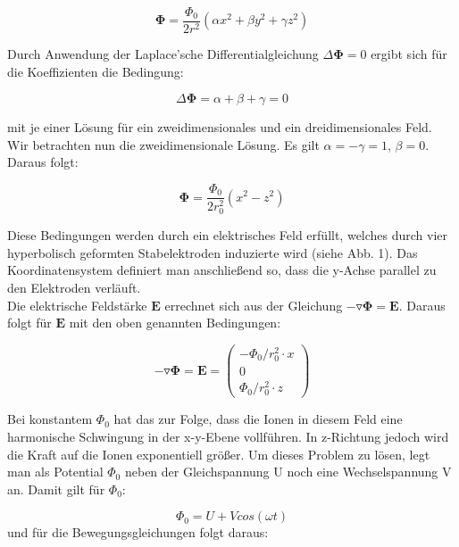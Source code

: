 \begin{equation}
\mathbf{\Phi} = \frac{\Phi_{0}}{2r^{2}}\left(\alpha x^{2}+\beta y^{2}+\gamma z^{2}\right)
\end{equation}

Durch Anwendung der Laplace'sche Differentialgleichung $\Delta \mathbf{\Phi} =0$ ergibt sich für die Koeffizienten die Bedingung:

\begin{equation}
\Delta \mathbf{\Phi} = \alpha + \beta +\gamma =0
\end{equation}

mit je einer Lösung für ein zweidimensionales und ein dreidimensionales Feld.\\
Wir betrachten nun die zweidimensionale Lösung. Es gilt $\alpha = -\gamma = 1$, $\beta =0$. Daraus folgt:

\begin{equation}
\mathbf{\Phi} = \frac{\Phi_{0}}{2r_{0}^{2}}\left(x^{2}-z^{2}\right)
\end{equation}

Diese Bedingungen werden durch ein elektrisches Feld erfüllt, welches durch vier hyperbolisch geformten Stabelektroden induzierte wird (siehe Abb. 1). Das Koordinatensystem definiert man anschließend so, dass die y-Achse parallel zu den Elektroden verläuft.
\\
Die elektrische Feldstärke $\mathbf{E}$ errechnet sich aus der Gleichung $-\mathbf{\triangledown \Phi} = \mathbf{E}$. Daraus folgt für $\mathbf{E}$ mit den oben genannten Bedingungen:

\begin{equation}
-\mathbf{\triangledown \Phi} = \mathbf{E} =
\left(
\begin{matrix}
-\Phi_{0}/r_{0}^{2} \cdot x\\
0\\
\Phi_{0}/r_{0}^{2} \cdot z
\end{matrix}
\right)
\end{equation}

Bei konstantem $\Phi_{0}$ hat das zur Folge, dass die Ionen in diesem Feld eine harmonische Schwingung in der x-y-Ebene vollführen. In z-Richtung jedoch wird die Kraft auf die Ionen exponentiell größer. Um dieses Problem zu lösen, legt man als Potential $\Phi_{0}$ neben der Gleichspannung U noch eine Wechselspannung V an. Damit gilt für $\Phi_{0}$:

\begin{equation}
\Phi_{0}=U + V cos(\omega t)
\end{equation}
\newpage
und für die Bewegungsgleichungen folgt daraus:

